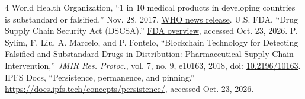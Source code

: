 \documentclass[10pt,twocolumn,letterpaper]{article}
\begin{document}
\begin{thebibliography}{4}\footnotesize
{} World Health Organization, ``1 in 10 medical products in developing countries is substandard or falsified,'' Nov. 28, 2017. \href{https://www.who.int/en/news/item/28-11-2017-1-in-10-medical-products-in-developing-countries-is-substandard-or-falsified}{WHO news release}.
 U.S. FDA, ``Drug Supply Chain Security Act (DSCSA).'' \href{https://www.fda.gov/drugs/drug-supply-chain-integrity/drug-supply-chain-security-act-dscsa}{FDA overview}, accessed Oct. 23, 2026.
 P. Sylim, F. Liu, A. Marcelo, and P. Fontelo, ``Blockchain Technology for Detecting Falsified and Substandard Drugs in Distribution: Pharmaceutical Supply Chain Intervention,'' \emph{JMIR Res. Protoc.}, vol. 7, no. 9, e10163, 2018, doi: \href{https://doi.org/10.2196/10163}{10.2196/10163}.
 IPFS Docs, ``Persistence, permanence, and pinning.'' \url{https://docs.ipfs.tech/concepts/persistence/}, accessed Oct. 23, 2026.
\end{thebibliography}
\end{document}
